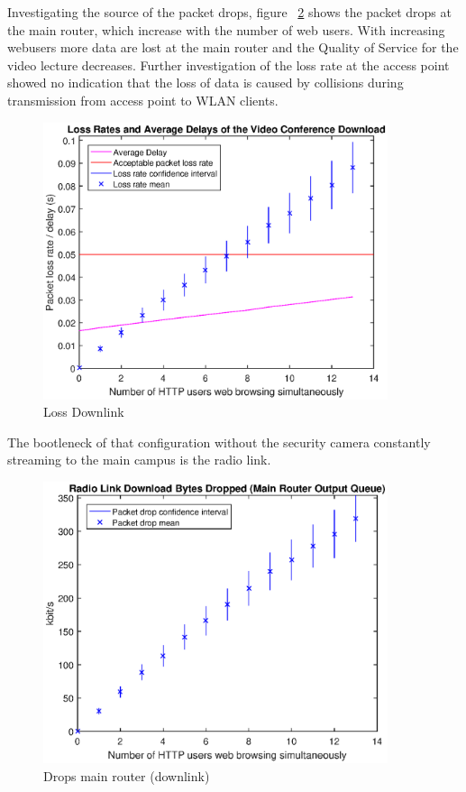 \documentclass[a4paper,10pt]{book}\usepackage{graphicx}
\begin{document}
Investigating the source of the packet drops, figure ~\ref{fig:mainRdrops} shows the packet drops at the main router, which increase with the number of 
web users. With increasing webusers more data are lost at the main router and the Quality of Service for the video lecture decreases.
Further investigation of the loss rate at the access point showed no indication that 
the loss of data is caused by collisions during transmission from access point to WLAN clients.

\begin{figure}[!ht]
  \begin{center}
    \includegraphics[width=0.9\textwidth]{off_loss_conf_download.eps} 
    \caption{Loss Downlink}
    \label{fig:losslecdown} 
  \end{center}
\end{figure}
The bootleneck of that configuration without the security camera constantly streaming to the main campus 
is the radio link.
\begin{figure}[!ht]
  \begin{center}
  \includegraphics[width=0.9\textwidth]{off_main_router_drops.eps}
    \caption{Drops main router (downlink)}
  \label{fig:mainRdrops}
  \end{center}
\end{figure}
\end{document}
